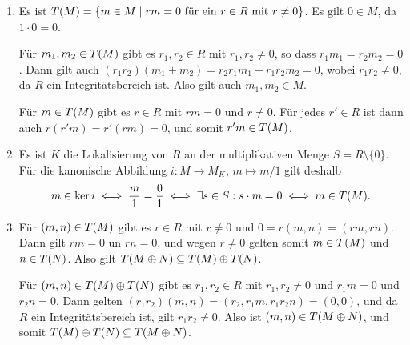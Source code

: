\begin{solution}
  \begin{enumerate}
    \item
      Es ist $T(M) = \{m \in M \mid \text{$rm = 0$ für ein $r \in R$ mit $r \neq 0$}\}$.
      Es gilt $0 \in M$, da $1 \cdot 0 = 0$.
      
      Für $m_1, m_2 \in T(M)$ gibt es $r_1, r_2 \in R$ mit $r_1, r_2 \neq 0$, so dass $r_1 m_1 = r_2 m_2 = 0$.
      Dann gilt auch $(r_1 r_2) (m_1 + m_2) = r_2 r_1 m_1 + r_1 r_2 m_2 = 0$, wobei $r_1 r_2 \neq 0$, da $R$ ein Integritätsbereich ist.
      Also gilt auch $m_1, m_2 \in M$.
      
      Für $m \in T(M)$ gibt es $r \in R$ mit $rm = 0$ und $r \neq 0$.
      Für jedes $r' \in R$ ist dann auch $r (r' m) = r' (rm) = 0$, und somit $r' m \in T(M)$.
      
    \item
      Es ist $K$ die Lokalisierung von $R$ an der multiplikativen Menge $S = R \setminus \{0\}$.
      Für die kanonische Abbildung $i \colon M \to M_K$, $m \mapsto m/1$ gilt deshalb
      \[
              m \in \ker i
        \iff  \frac{m}{1} = \frac{0}{1}
        \iff  \exists s \in S : s \cdot m = 0
        \iff  m \in T(M).
      \]

    \item
      Für $(m, n) \in T(M)$ gibt es $r \in R$ mit $r \neq 0$ und $0 = r(m,n) = (rm,rn)$.
      Dann gilt $rm = 0$ un $rn = 0$, und wegen $r \neq 0$ gelten somit $m \in T(M)$ und $n \in T(N)$.
      Also gilt $T(M \oplus N) \subseteq T(M) \oplus T(N)$.
      
      Für $(m, n) \in T(M) \oplus T(N)$ gibt es $r_1, r_2 \in R$ mit $r_1, r_2 \neq 0$ und $r_1 m = 0$ und $r_2 n = 0$.
      Dann gelten $(r_1 r_2) (m, n) = (r_2, r_1 m, r_1 r_2 n) = (0,0)$, und da $R$ ein Integritätsbereich ist, gilt $r_1 r_2 \neq 0$.
      Also ist $(m,n) \in T(M \oplus N)$, und somit $T(M) \oplus T(N) \subseteq T(M \oplus N)$.
      
    

\end{enumerate}
\end{solution}

